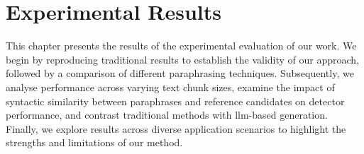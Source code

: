 \chapter{Experimental Results}
\label{chap:experimental_results}

This chapter presents the results of the experimental evaluation of our work. 
We begin by reproducing traditional results to establish the validity of our approach, followed by a comparison of different paraphrasing techniques. 
Subsequently, we analyse performance across varying text chunk sizes, examine the impact of syntactic similarity between paraphrases and reference candidates on detector performance, and contrast traditional methods with \ac{llm}-based \imp{} generation. 
Finally, we explore results across diverse application scenarios to highlight the strengths and limitations of our method. 












